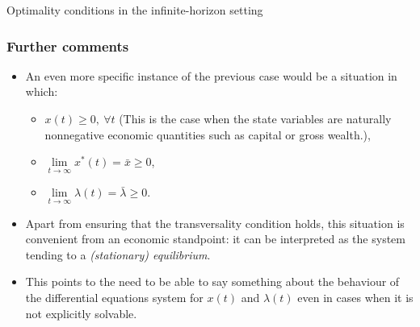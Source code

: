 \documentclass[10pt]{beamer}
\theoremstyle{definition}
\begin{document}
\begin{section}{Optimality conditions in the infinite-horizon setting}
\begin{frame}[fragile]
\frametitle{Further comments}
\begin{itemize}\itemsep1em
\item An even more specific instance of the previous case would be a situation in which:
	\begin{itemize}\itemsep1em
	\item  $ x(t)\geq 0,~\forall t$ (This is the case when the state variables are naturally nonnegative economic quantities such as capital or gross wealth.),
	\item $ \lim\limits_{t\rightarrow \infty} x^*(t) = \bar{x} \geq 0 $,
	\item $ \lim\limits_{t\rightarrow \infty} \lambda(t) = \bar{\lambda} \geq 0 $.
	\end{itemize}
\item Apart from ensuring that the transversality condition holds, this situation is convenient from an economic standpoint: it can be interpreted as the system tending to a \emph{(stationary) equilibrium}.
\item This points to the need to be able to say something about the behaviour of the differential equations system for $ x(t) $ and $ \lambda(t) $ even in cases when it is not explicitly solvable.
\end{itemize}
\end{frame}
\end{section}
\end{document}
